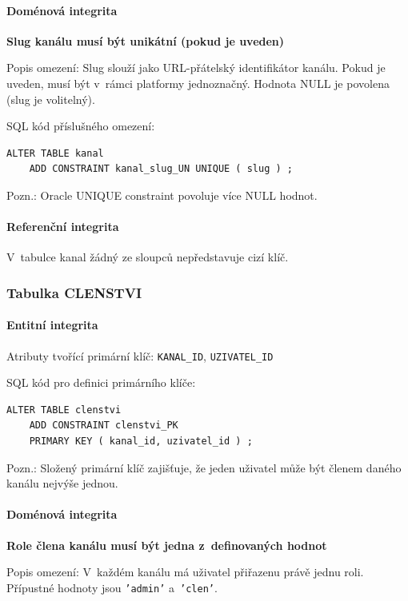 \documentclass[12pt,a4paper]{article}
\begin{document}
\paragraph{Doménová integrita}

\textbf{Slug kanálu musí být unikátní (pokud je uveden)}

Popis omezení: Slug slouží jako URL-přátelský identifikátor kanálu. Pokud je uveden, musí
být v~rámci platformy jednoznačný. Hodnota NULL je povolena (slug je volitelný).

SQL kód příslušného omezení:
\begin{lstlisting}
ALTER TABLE kanal
    ADD CONSTRAINT kanal_slug_UN UNIQUE ( slug ) ;
\end{lstlisting}
Pozn.: Oracle UNIQUE constraint povoluje více NULL hodnot.

\paragraph{Referenční integrita}
V~tabulce kanal žádný ze sloupců nepředstavuje cizí klíč.

\subsubsection{Tabulka CLENSTVI}

\paragraph{Entitní integrita}
Atributy tvořící primární klíč: \texttt{KANAL\_ID}, \texttt{UZIVATEL\_ID}

SQL kód pro definici primárního klíče:
\begin{lstlisting}
ALTER TABLE clenstvi
    ADD CONSTRAINT clenstvi_PK
    PRIMARY KEY ( kanal_id, uzivatel_id ) ;
\end{lstlisting}
Pozn.: Složený primární klíč zajišťuje, že jeden uživatel může být členem daného kanálu
nejvýše jednou.

\paragraph{Doménová integrita}

\textbf{Role člena kanálu musí být jedna z~definovaných hodnot}

Popis omezení: V~každém kanálu má uživatel přiřazenu právě jednu roli. Přípustné hodnoty
jsou \texttt{'admin'} a~\texttt{'clen'}.
\end{document}
